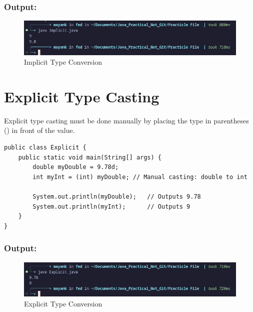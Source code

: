 \documentclass[a4paper,12pt]{article}
\begin{document}
\subsubsection{Output: }
\begin{figure}[H]
    \centering
    \includegraphics[width=0.9\linewidth]{images/ImplicitOut.png}
    \caption{Implicit Type Conversion}
    \label{fig:sample_image}
\end{figure}

\section{Explicit Type Casting}
Explicit type casting must be done manually by placing the type in parentheses () in front of the value.
\begin{center}
\end{center}
\begin{lstlisting}
public class Explicit {
    public static void main(String[] args) {
        double myDouble = 9.78d;
        int myInt = (int) myDouble; // Manual casting: double to int
    
        System.out.println(myDouble);   // Outputs 9.78
        System.out.println(myInt);      // Outputs 9
    }
}
\end{lstlisting}
\subsubsection{Output: }
\begin{figure}[H]
    \centering
    \includegraphics[width=0.9\linewidth]{images/ExplicitOut.png}
    \caption{Explicit Type Conversion}
    \label{fig:sample_image}
\end{figure}

\setcounter{section}{0}
\end{document}

